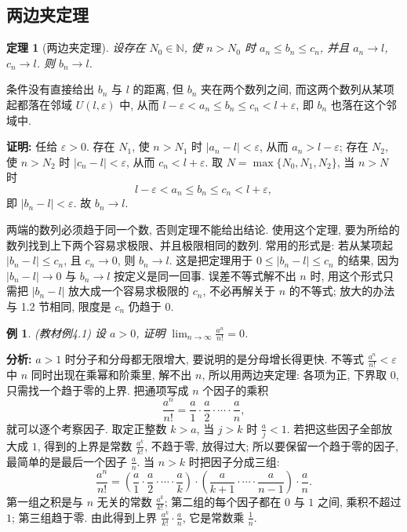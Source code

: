 \documentclass[UTF8,openany]{ctexbook}
\theoremstyle{chinesetextbook}
\newtheorem{example}{例}[section]
\newtheorem{theorem}{定理}[section]
\newenvironment{cnproof}{\par\indent\textbf{证明:} \ignorespaces}{\par}
\begin{document}
\subsection{两边夹定理}
\begin{theorem}[两边夹定理]
设存在 $N_0\in\mathbb N$, 使 $n>N_0$ 时 $a_n\le b_n\le c_n$, 并且 $a_n\to l$, $c_n\to l$. 则 $b_n\to l$.
\end{theorem}
条件没有直接给出 $b_n$ 与 $l$ 的距离, 但 $b_n$ 夹在两个数列之间, 而这两个数列从某项起都落在邻域 $U(l,\varepsilon)$ 中, 从而 $l-\varepsilon<a_n\le b_n\le c_n<l+\varepsilon$, 即 $b_n$ 也落在这个邻域中.
\begin{cnproof}
任给 $\varepsilon>0$. 存在 $N_1$, 使 $n>N_1$ 时 $|a_n-l|<\varepsilon$, 从而 $a_n>l-\varepsilon$; 存在 $N_2$, 使 $n>N_2$ 时 $|c_n-l|<\varepsilon$, 从而 $c_n<l+\varepsilon$. 取 $N=\max\{N_0,N_1,N_2\}$, 当 $n>N$ 时
\[
l-\varepsilon<a_n\le b_n\le c_n<l+\varepsilon,
\]
即 $|b_n-l|<\varepsilon$. 故 $b_n\to l$.
\end{cnproof}
两端的数列必须趋于同一个数, 否则定理不能给出结论. 使用这个定理, 要为所给的数列找到上下两个容易求极限、并且极限相同的数列. 常用的形式是: 若从某项起 $|b_n-l|\le c_n$, 且 $c_n\to0$, 则 $b_n\to l$. 这是把定理用于 $0\le|b_n-l|\le c_n$ 的结果, 因为 $|b_n-l|\to0$ 与 $b_n\to l$ 按定义是同一回事. 误差不等式解不出 $n$ 时, 用这个形式只需把 $|b_n-l|$ 放大成一个容易求极限的 $c_n$, 不必再解关于 $n$ 的不等式; 放大的办法与 1.2 节相同, 限度是 $c_n$ 仍趋于 $0$.
\begin{example}\label{ex:4-1}
\textnormal{(教材例4.1)} 设 $a>0$, 证明 $\displaystyle\lim_{n\to\infty}\frac{a^n}{n!}=0$.
\end{example}
\par\indent\textbf{分析:} $a>1$ 时分子和分母都无限增大, 要说明的是分母增长得更快. 不等式 $\displaystyle\frac{a^n}{n!}<\varepsilon$ 中 $n$ 同时出现在乘幂和阶乘里, 解不出 $n$, 所以用两边夹定理: 各项为正, 下界取 $0$, 只需找一个趋于零的上界. 把通项写成 $n$ 个因子的乘积
\[
\frac{a^n}{n!}=\frac a1\cdot\frac a2\cdot\cdots\cdot\frac an,
\]
就可以逐个考察因子. 取定正整数 $k>a$, 当 $j>k$ 时 $\displaystyle\frac aj<1$. 若把这些因子全部放大成 $1$, 得到的上界是常数 $\displaystyle\frac{a^k}{k!}$, 不趋于零, 放得过大; 所以要保留一个趋于零的因子, 最简单的是最后一个因子 $\displaystyle\frac an$. 当 $n>k$ 时把因子分成三组:
\[
\frac{a^n}{n!}=\left(\frac a1\cdot\frac a2\cdot\cdots\cdot\frac ak\right)\cdot\left(\frac a{k+1}\cdot\cdots\cdot\frac a{n-1}\right)\cdot\frac an.
\]
第一组之积是与 $n$ 无关的常数 $\displaystyle\frac{a^k}{k!}$; 第二组的每个因子都在 $0$ 与 $1$ 之间, 乘积不超过 $1$; 第三组趋于零. 由此得到上界 $\displaystyle\frac{a^k}{k!}\cdot\frac an$, 它是常数乘 $\displaystyle\frac1n$.
\end{document}
